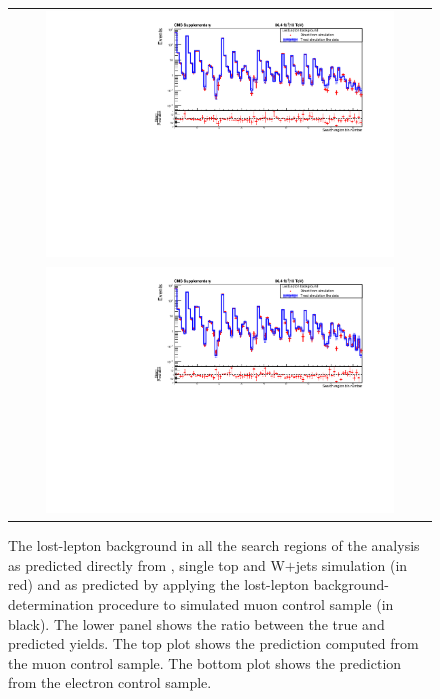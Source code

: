 \begin{figure}[htbp]
\begin{center}
\begin{tabular}{c}
\includegraphics[width=0.85\textwidth, height=0.35\textheight]{sections/mc4/Backgrounds/LostLepton/figures/v3_closure_mu_cs.pdf}\\
\includegraphics[width=0.85\textwidth, height=0.35\textheight]{sections/mc4/Backgrounds/LostLepton/figures/v3_closure_el_cs.pdf}
\end{tabular}
\end{center}
\caption{The lost-lepton background in all the search regions of the analysis as predicted
directly from \ttbar, single top and W$+$jets simulation (in red) and as predicted by applying the lost-lepton background-determination procedure to simulated muon
control sample (in black). The lower panel shows the ratio between the true and predicted yields. The top plot shows the prediction computed from the muon control sample. The bottom plot shows the prediction from the electron control sample.}
\label{fig:closureSBisotrk}
\end{figure}

